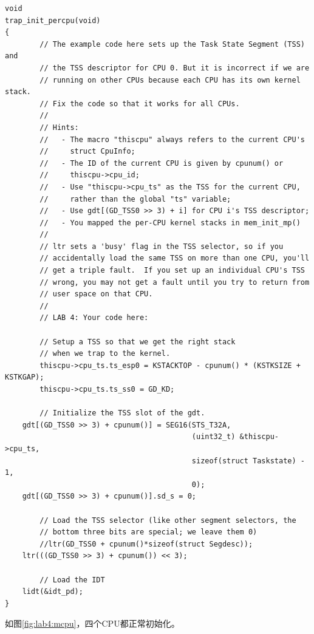 \begin{ExerciseList}
\begin{verbatim}
void
trap_init_percpu(void)
{
        // The example code here sets up the Task State Segment (TSS) and
        // the TSS descriptor for CPU 0. But it is incorrect if we are
        // running on other CPUs because each CPU has its own kernel stack.
        // Fix the code so that it works for all CPUs.
        //
        // Hints:
        //   - The macro "thiscpu" always refers to the current CPU's
        //     struct CpuInfo;
        //   - The ID of the current CPU is given by cpunum() or
        //     thiscpu->cpu_id;
        //   - Use "thiscpu->cpu_ts" as the TSS for the current CPU,
        //     rather than the global "ts" variable;
        //   - Use gdt[(GD_TSS0 >> 3) + i] for CPU i's TSS descriptor;
        //   - You mapped the per-CPU kernel stacks in mem_init_mp()
        //
        // ltr sets a 'busy' flag in the TSS selector, so if you
        // accidentally load the same TSS on more than one CPU, you'll
        // get a triple fault.  If you set up an individual CPU's TSS
        // wrong, you may not get a fault until you try to return from
        // user space on that CPU.
        //
        // LAB 4: Your code here:

        // Setup a TSS so that we get the right stack
        // when we trap to the kernel.
        thiscpu->cpu_ts.ts_esp0 = KSTACKTOP - cpunum() * (KSTKSIZE + KSTKGAP);
        thiscpu->cpu_ts.ts_ss0 = GD_KD;

        // Initialize the TSS slot of the gdt.
    gdt[(GD_TSS0 >> 3) + cpunum()] = SEG16(STS_T32A,
                                           (uint32_t) &thiscpu->cpu_ts,
                                           sizeof(struct Taskstate) - 1,
                                           0);
    gdt[(GD_TSS0 >> 3) + cpunum()].sd_s = 0;

        // Load the TSS selector (like other segment selectors, the
        // bottom three bits are special; we leave them 0)
        //ltr(GD_TSS0 + cpunum()*sizeof(struct Segdesc));
    ltr(((GD_TSS0 >> 3) + cpunum()) << 3);

        // Load the IDT
    lidt(&idt_pd);
}
\end{verbatim}

如图\ref{fig:lab4:mcpu}，四个CPU都正常初始化。


\end{ExerciseList}
